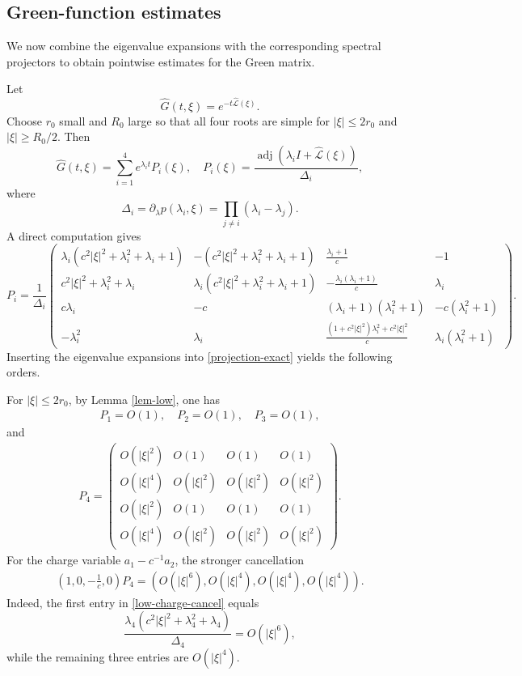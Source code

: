 \documentclass[10pt,reqno]{amsart}
\numberwithin{equation}{section}
\begin{document}
%
%
%
%
%
%

\subsection{Green-function estimates}
We now combine the eigenvalue expansions with the corresponding spectral projectors to obtain pointwise estimates for the Green matrix.

Let
\[
\widehat G(t,\xi)=e^{-t\widehat{\mathcal L}(\xi)}.
\]
Choose $r_0$ small and $R_0$ large so that all four roots are simple for $|\xi|\le2r_0$ and $|\xi|\ge R_0/2$.  Then
\begin{equation}\label{green}
\widehat G(t,\xi)=\sum_{i=1}^4e^{\lambda_it}P_i(\xi),
\quad
P_i(\xi)=\frac{\operatorname{adj}(\lambda_i I+\widehat{\mathcal L}(\xi))}{\Delta_i},
\end{equation}
where
\[
\Delta_i=\partial_\lambda p(\lambda_i,\xi)=\prod_{j\ne i}(\lambda_i-\lambda_j).
\]
A direct computation gives
\begin{equation}\label{projection-exact}
P_i=\frac1{\Delta_i}
\begin{pmatrix}
\lambda_i(c^2|\xi|^2+\lambda_i^2+\lambda_i+1)
&-(c^2|\xi|^2+\lambda_i^2+\lambda_i+1)
&\frac{\lambda_i+1}{c}&-1\\
 c^2|\xi|^2+\lambda_i^2+\lambda_i
&\lambda_i(c^2|\xi|^2+\lambda_i^2+\lambda_i+1)
&-\frac{\lambda_i(\lambda_i+1)}{c}&\lambda_i\\
 c\lambda_i&-c&(\lambda_i+1)(\lambda_i^2+1)&-c(\lambda_i^2+1)\\
-\lambda_i^2&\lambda_i
&\frac{(1+c^2|\xi|^2)\lambda_i^2+c^2|\xi|^2}{c}
&\lambda_i(\lambda_i^2+1)
\end{pmatrix}.
\end{equation}
Inserting the eigenvalue expansions into \eqref{projection-exact} yields the following orders.

For $|\xi|\le 2r_0$, by Lemma \ref{lem-low}, one has
\begin{align}\label{low-projection}
P_1=O(1),\quad P_2=O(1),\quad P_3=O(1),
\end{align}
and
\begin{align}\label{low-P4}
P_4=
\begin{pmatrix}
O(|\xi|^2)&O(1)&O(1)&O(1)\\
O(|\xi|^4)&O(|\xi|^2)&O(|\xi|^2)&O(|\xi|^2)\\
O(|\xi|^2)&O(1)&O(1)&O(1)\\
O(|\xi|^4)&O(|\xi|^2)&O(|\xi|^2)&O(|\xi|^2)
\end{pmatrix}.
\end{align}
For the charge variable $a_1-c^{-1}a_2$, the stronger cancellation
\begin{align}\label{low-charge-cancel}
\left(1,0,-\frac1c,0\right)P_4
=\left(O(|\xi|^6),O(|\xi|^4),O(|\xi|^4),O(|\xi|^4)\right).
\end{align}
Indeed, the first entry in \eqref{low-charge-cancel} equals
\[
\frac{\lambda_4(c^2|\xi|^2+\lambda_4^2+\lambda_4)}{\Delta_4}=O(|\xi|^6),
\]
while the remaining three entries are $O(|\xi|^4)$.
\end{document}
